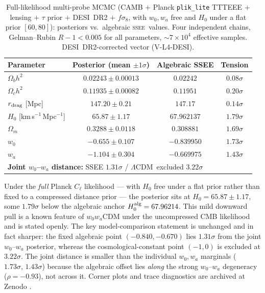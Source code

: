 \documentclass[12pt,a4paper]{article}
\newcommand{\SSEE}{\textsc{ssee}}
\newcommand{\LCDM}{$\Lambda$CDM}
\begin{document}
\begin{table}[htbp]
\centering
\caption{Full-likelihood multi-probe MCMC (CAMB $+$ Planck \texttt{plik\_lite}
TTTEEE $+$ lensing $+$ $\tau$ prior $+$ DESI~DR2 $+$ $f\sigma_8$, with $w_0,w_a$
free and $H_0$ under a flat prior $[60,80]$): posteriors vs.\ algebraic \SSEE\
values. Four independent chains, Gelman--Rubin $R-1<0.005$ for all parameters,
$\sim7\times10^4$ effective samples. DESI~DR2-corrected vector (V-L4-DESI).}
\label{tab:mcmc_full}
\begin{tabular}{p{} c c c}
\toprule
Parameter & Posterior (mean $\pm1\sigma$) & Algebraic SSEE & Tension \\
\midrule
$\Omega_b h^2$                     & $0.02243 \pm 0.00013$ & $0.02242$ & $0.08\sigma$ \\
$\Omega_c h^2$                     & $0.11935 \pm 0.00082$ & $0.11951$ & $0.20\sigma$ \\
$r_{\rm drag}$ [Mpc]               & $147.20  \pm 0.21$    & $147.17$  & $0.14\sigma$ \\
$H_0$ [km\,s$^{-1}$\,Mpc$^{-1}$]   & $65.87   \pm 1.17$    & $67.962137$   & $1.79\sigma$ \\
$\Omega_m$                         & $0.3288  \pm 0.0118$  & $0.308881$ & $1.69\sigma$ \\
$w_0$                              & $-0.655  \pm 0.107$   & $-0.839950$  & $1.73\sigma$ \\
$w_a$                              & $-1.104  \pm 0.304$   & $-0.669975$  & $1.43\sigma$ \\
\midrule
\multicolumn{3}{l}{\textbf{Joint $w_0$--$w_a$ distance:} SSEE $1.31\sigma$ / \LCDM\ excluded $3.22\sigma$} \\
\bottomrule
\end{tabular}
\end{table}

Under the \emph{full} Planck $C_\ell$ likelihood --- with $H_0$ free under a
flat prior rather than fixed to a compressed distance prior --- the posterior
sits at $H_0=65.87\pm1.17$, some $1.79\sigma$ below the algebraic anchor
$H_0^{\rm alg}=67.96214$. This mild downward pull is a known feature of
$w_0w_a$CDM under the uncompressed CMB likelihood and is stated openly. The key
model-comparison statement is unchanged and in fact sharper: the fixed
algebraic point $(-0.840,-0.670)$ lies $1.31\sigma$ from the joint $w_0$--$w_a$
posterior, whereas the cosmological-constant point $(-1,0)$ is excluded at
$3.22\sigma$. The joint distance is smaller than the individual $w_0,w_a$
marginals ($1.73\sigma,\,1.43\sigma$) because the algebraic offset lies
\emph{along} the strong $w_0$--$w_a$ degeneracy ($\rho=-0.93$), not across it.
Corner plots and trace diagnostics are archived at Zenodo
\citep{AlmeidaSSEE2026zenodo}.
\end{document}
